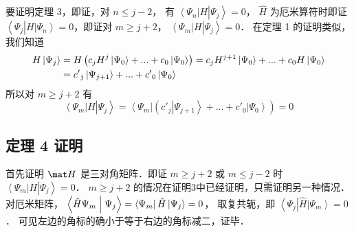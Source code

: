 要证明定理 3，即证，对 $n \leqslant j - 2$， 有 $\left\langle {{\Psi _n}} \right|H\left| {{\Psi _j}} \right\rangle  = 0$， $\hat H$ 为厄米算符时即证 $\left\langle {{\Psi _j}} \right|H\left| {{\Psi _n}} \right\rangle  = 0$，即证对 $m \geqslant j + 2$，  $\left\langle {{\Psi _m}} \right|H\left| {{\Psi _j}} \right\rangle  = 0$． 在定理 1 的证明类似，我们知道
\begin{equation}\begin{aligned}
  H\left| {{\Psi _j}} \right\rangle  &= H\left( {{c_j}{H^j}\left| {{\Psi _0}} \right\rangle  + ... + {c_0}\left| {{\Psi _0}} \right\rangle } \right) = {c_j}{H^{j + 1}}\left| {{\Psi _0}} \right\rangle  + ... + {c_0}H\left| {{\Psi _0}} \right\rangle \\
&= {{c'}_j}\left| {{\Psi _{j + 1}}} \right\rangle  + ... + {{c'}_0}\left| {{\Psi _0}} \right\rangle  \hfill \\ 
\end{aligned}\end{equation}
所以对 $m \geqslant j + 2$ 有
\begin{equation}
\left\langle {{\Psi _m}} \right|H\left| {{\Psi _j}} \right\rangle  = \left\langle {{\Psi _m}} \right|\left( {{{c'}_j}\left| {{\Psi _{j + 1}}} \right\rangle  + ... + {{c'}_0}\left| {{\Psi _0}} \right\rangle } \right) = 0
\end{equation}

\subsection{定理 4 证明}

首先证明 $\mat H$ 是三对角矩阵．即证 $m \geqslant j + 2$ 或 $m \leqslant j - 2$ 时 {$\left\langle {{\Psi _m}} \right|H\left| {{\Psi _j}} \right\rangle  = 0$．}
$m \geqslant j + 2$ 的情况在证明3中已经证明，只需证明另一种情况．
对厄米矩阵， $\left\langle {{\hat H{\Psi _m}}}
 \mathrel{\left | {\vphantom {{\hat H{\Psi _m}} {{\Psi _j}}}}
 \right. \kern-\nulldelimiterspace}
 {{{\Psi _j}}} \right\rangle  = \left\langle {{\Psi _m}} \right| \hat H\left| {{\Psi _j}} \right\rangle  = 0$， 取复共轭，即 $\left\langle {{\Psi _j}} \right|\hat H\left| {{\Psi _m}} \right\rangle  = 0$． 可见左边的角标的确小于等于右边的角标减二，证毕．


